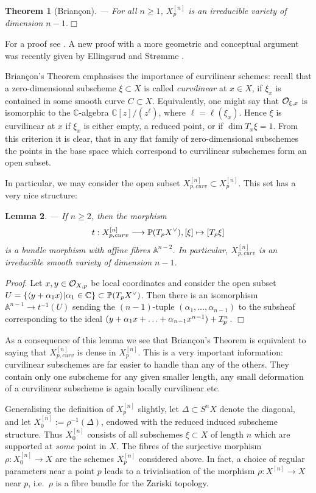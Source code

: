 \documentclass[twoside,11pt]{article}
\newtheorem{theorem}{Theorem}[section]
\newtheorem{lemma}[theorem]{Lemma}
\newcommand{\prf}{{\kursiv Proof}. }
\newcommand{\qed}{\hspace*{\fill}$\Box$\vspace{2ex}}
\newcommand{\kursiv}{\sl}
\newcommand{\ki}{{\cal I}}
\newcommand{\ko}{{\cal O}}
\newcommand{\IA}{{\mathbb A}}
\newcommand{\IC}{{\mathbb C}}
\newcommand{\IP}{{\mathbb P}}
\newcommand{\dual}{\makebox[0mm]{}^{{\scriptstyle\vee}}}
\newcommand{\lra}{\longrightarrow}
\begin{document}
\begin{theorem}[Brian\c{c}on]--- For all $n\geq1$, $X^{[n]}_p$ is an irreducible variety of dimension $n-1$.\qed
\end{theorem}

For a proof see \cite{Briancon}. A new proof with a more geometric and
conceptual argument was recently given by Ellingsrud and Str\o{}mme
\cite{EllStrCoefficient}.

Brian\c{c}on's Theorem emphasises the importance of curvilinear schemes: recall
that a zero-dimensional subscheme $\xi\subset X$ is called {\em curvilinear} 
at $x\in X$, if $\xi_x$ is contained in some smooth curve $C\subset X$. Equivalently, one might say that $\ko_{\xi,x}$ is isomorphic to the 
$\IC$-algebra $\IC[z]/(z^\ell)$, where $\ell=\ell(\xi_x)$.
Hence $\xi$ is curvilinear at $x$ if $\xi_x$ is either empty, a reduced point, or if 
$\dim T_x\xi=1$. From this criterion it is clear, that in any flat family of zero-dimensional subschemes the points in the base space which correspond to curvilinear subschemes form an open subset.

In particular, we may consider the open subset $X^{[n]}_{p,curv}\subset 
X^{[n]}_p$. This set has a very nice structure:

\begin{lemma}\label{curvilinearones}--- If $n\geq 2$, then the morphism
$$t:X^{[n]}_{p,curv}\lra \IP(T_pX\dual), [\xi]\mapsto [T_p\xi]$$
is a bundle morphism with affine fibres $\IA^{n-2}$. In particular, $X^{[n]}_{p,curv}$ is an irreducible smooth variety of dimension $n-1$.
\end{lemma}


\prf Let $x,y\in\ko_{X,p}$ be local coordinates and consider the open subset
$U=\{\langle y+\alpha_1x\rangle|\alpha_1\in \IC\}\subset \IP(T_pX\dual)$. Then there is an isomorphism $\IA^{n-1}\to t^{-1}(U)$ sending the $(n-1)$-tuple 
$(\alpha_1,\ldots,\alpha_{n-1})$ to the subsheaf corresponding
to the ideal $(y+\alpha_1x+\ldots+\alpha_{n-1}x^{n-1})+\ki_{p}^{n}$.
\qed

As a consequence of this lemma we see that
Brian\c{c}on's Theorem is equivalent to saying that $X^{[n]}_{p,curv}$ is dense 
in $X^{[n]}_p$. This is a very important information: curvilinear subschemes 
are far easier to handle than any of the others. They contain only one subscheme
for any given smaller length, any small deformation of a curvilinear subscheme
is again locally curvilinear etc.

Generalising the definition of $X^{[n]}_p$ slightly, let $\Delta\subset S^nX$
denote the diagonal, and let $X^{[n]}_0:=\rho^{-1}(\Delta)$, endowed with
the reduced induced subscheme structure. Thus $X^{[n]}_0$ consists of all
subschemes $\xi\subset X$ of length $n$ which are supported at {\em some}
point in $X$. The fibres of the surjective
morphism $\rho:X_0^{[n]}\to X$ are the schemes $X^{[n]}_p$ considered above.
In fact, a choice of regular parameters near a point $p$ leads to a 
trivialisation of the morphism $\rho:X^{[n]}\to X$ near $p$, i.e.\ $\rho$
is a fibre bundle for the Zariski topology.
\end{document}
